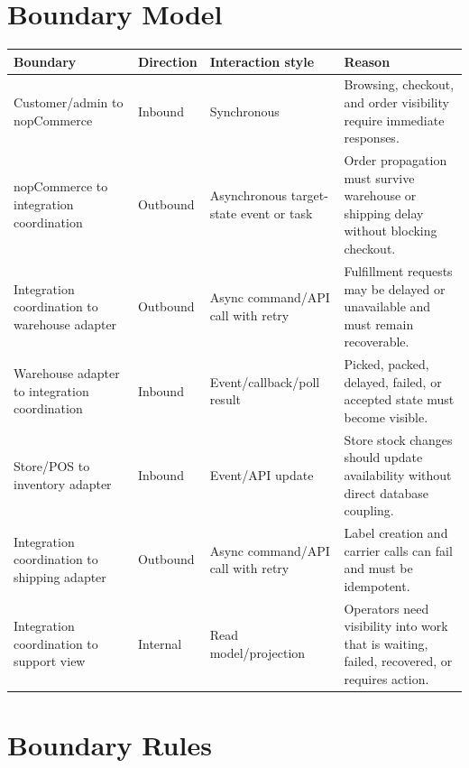 \section{Boundary Model}

\begingroup
\small
\setlength{\tabcolsep}{4pt}
\renewcommand{\arraystretch}{1.15}
\begin{center}
\begin{tabular}{|p{}|p{}|p{}|p{}|}
\hline
\textbf{Boundary} & \textbf{Direction} & \textbf{Interaction style} & \textbf{Reason} \\
\hline
Customer/admin to nopCommerce & Inbound & Synchronous & Browsing, checkout, and order visibility require immediate responses. \\
\hline
nopCommerce to integration coordination & Outbound & Asynchronous target-state event or task & Order propagation must survive warehouse or shipping delay without blocking checkout. \\
\hline
Integration coordination to warehouse adapter & Outbound & Async command/API call with retry & Fulfillment requests may be delayed or unavailable and must remain recoverable. \\
\hline
Warehouse adapter to integration coordination & Inbound & Event/callback/poll result & Picked, packed, delayed, failed, or accepted state must become visible. \\
\hline
Store/POS to inventory adapter & Inbound & Event/API update & Store stock changes should update availability without direct database coupling. \\
\hline
Integration coordination to shipping adapter & Outbound & Async command/API call with retry & Label creation and carrier calls can fail and must be idempotent. \\
\hline
Integration coordination to support view & Internal & Read model/projection & Operators need visibility into work that is waiting, failed, recovered, or requires action. \\
\hline
\end{tabular}
\end{center}
\endgroup

\section{Boundary Rules}

